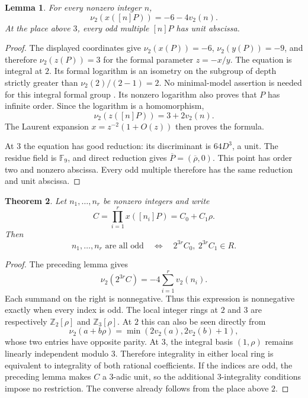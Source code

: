 \documentclass[11pt,a4paper]{article}
\newtheorem{theorem}{Theorem}[section]
\newtheorem{lemma}[theorem]{Lemma}
\theoremstyle{definition}
\theoremstyle{remark}
\begin{document}
\begin{lemma}\label{lem:exact-dyadic-index}
For every nonzero integer $n$,
\[
 \nu_2(x([n]P))=-6-4v_2(n).
\]
At the place above $3$, every odd multiple $[n]P$ has unit abscissa.
\end{lemma}
\begin{proof}
The displayed coordinates give
$\nu_2(x(P))=-6$, $\nu_2(y(P))=-9$, and therefore
$\nu_2(z(P))=3$ for the formal parameter $z=-x/y$.
The equation is integral at $2$. Its formal logarithm is an isometry
on the subgroup of depth strictly greater than
$\nu_2(2)/(2-1)=2$. No minimal-model assertion is needed for this
integral formal group \cite[Theorem IV.6.4]{Silverman2009}.
Its nonzero logarithm also proves that $P$ has infinite order.
Since the logarithm is a homomorphism,
\[
 \nu_2(z([n]P))=3+2v_2(n).
\]
The Laurent expansion $x=z^{-2}(1+O(z))$ then proves the formula.

At $3$ the equation has good reduction: its discriminant is
$64D^3$, a unit. The residue field is $\mathbb F_9$, and direct
reduction gives $\overline P=(\overline\rho,0)$.
This point has order two and nonzero abscissa. Every odd multiple
therefore has the same reduction and unit abscissa.
\end{proof}

\begin{theorem}\label{thm:parity-product}
Let $n_1,\ldots,n_r$ be nonzero integers and write
\[
        C=\prod_{i=1}^{r}x([n_i]P)=C_0+C_1\rho.
\]
Then
\[
 n_1,\ldots,n_r\text{ are all odd}
 \quad\Longleftrightarrow\quad
                2^{3r}C_0,\ 2^{3r}C_1\in R.
\]
\end{theorem}
\begin{proof}
The preceding lemma gives
\[
              \nu_2(2^{3r}C)=-4\sum_{i=1}^{r}v_2(n_i).
\]
Each summand on the right is nonnegative. Thus this expression is
nonnegative exactly when every index is odd.
The local integer rings at $2$ and $3$ are respectively
$\mathbb Z_2[\rho]$ and $\mathbb Z_3[\rho]$.
At $2$ this can also be seen directly from
\[
 \nu_2(a+b\rho)=\min(2v_2(a),2v_2(b)+1),
\]
whose two entries have opposite parity. At $3$, the integral basis
$(1,\rho)$ remains linearly independent modulo $3$.
Therefore integrality in either local ring is equivalent to
integrality of both rational coefficients. If the indices are odd,
the preceding lemma makes $C$ a $3$-adic unit, so the additional
$3$-integrality conditions impose no restriction. The converse
already follows from the place above $2$.
\end{proof}
\end{document}

